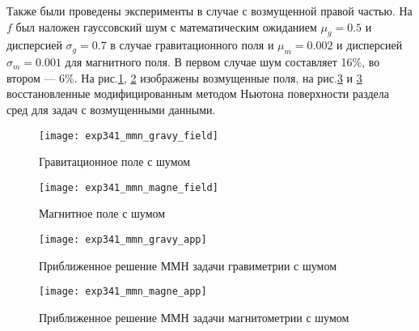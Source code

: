Также были проведены эксперименты в случае с возмущенной правой частью. На $f$ был наложен гауссовский шум с математическим ожиданием $\mu_g=0.5$ и дисперсией $\sigma_g=0.7$ в случае гравитационного поля и $\mu_m=0.002$ и дисперсией $\sigma_m=0.001$ для магнитного поля. В первом случае шум составляет 16\%, во втором --- 6\%. На рис.\ref{fig:exp341_mmn_gravy_field}, \ref{fig:exp341_mmn_magne_field} изображены возмущенные поля, на рис.\ref{fig:exp341_mmn_gravy_app} и \ref{fig:exp341_mmn_gravy_app} восстановленные модифицированным методом Ньютона поверхности раздела сред для задач с возмущенными данными.
\begin{figure}[H]
	\centering
	\texttt{[image: exp341\_mmn\_gravy\_field]}
	\caption{Гравитационное поле с шумом}
	\label{fig:exp341_mmn_gravy_field}
\end{figure}
\begin{figure}[H]
	\centering
	\texttt{[image: exp341\_mmn\_magne\_field]}
	\caption{Магнитное поле с шумом}
	\label{fig:exp341_mmn_magne_field}
\end{figure}
\begin{figure}[H]
	\centering
	\texttt{[image: exp341\_mmn\_gravy\_app]}
	\caption{Приближенное решение ММН задачи гравиметрии с шумом}
	\label{fig:exp341_mmn_gravy_app}
\end{figure}
\begin{figure}[H]
	\centering
	\texttt{[image: exp341\_mmn\_magne\_app]}
	\caption{Приближенное решение ММН задачи магнитометрии с шумом}
	\label{fig:exp341_mmn_magne_app}
\end{figure}

